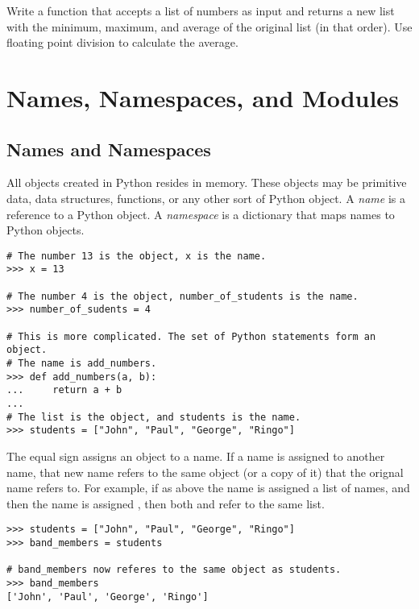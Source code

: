 \begin{problem}
Write a function that accepts a list of numbers as input and returns a new list with the minimum, maximum, and average of the original list (in that order).
Use floating point division to calculate the average.
\end{problem}

\section*{Names, Namespaces, and Modules}

\subsection*{Names and Namespaces}
All objects created in Python resides in memory.
These objects may be primitive data, data structures, functions, or any other sort of Python object.
A \emph{name} is a reference to a Python object.
A \emph{namespace} is a dictionary that maps names to Python objects.

\begin{lstlisting}
# The number 13 is the object, x is the name.
>>> x = 13

# The number 4 is the object, number_of_students is the name.
>>> number_of_sudents = 4

# This is more complicated. The set of Python statements form an object.
# The name is add_numbers.
>>> def add_numbers(a, b):
...     return a + b
... 
# The list is the object, and students is the name.
>>> students = ["John", "Paul", "George", "Ringo"]
\end{lstlisting}

The equal sign assigns an object to a name.
If a name is assigned to another name, that new name refers to the same object (or a copy of it) that the orignal name refers to.
For example, if as above the name  is assigned a list of names, and then the name  is assigned , then both  and  refer to the same list.

\begin{lstlisting}
>>> students = ["John", "Paul", "George", "Ringo"]
>>> band_members = students

# band_members now referes to the same object as students.
>>> band_members
['John', 'Paul', 'George', 'Ringo']
\end{lstlisting}

